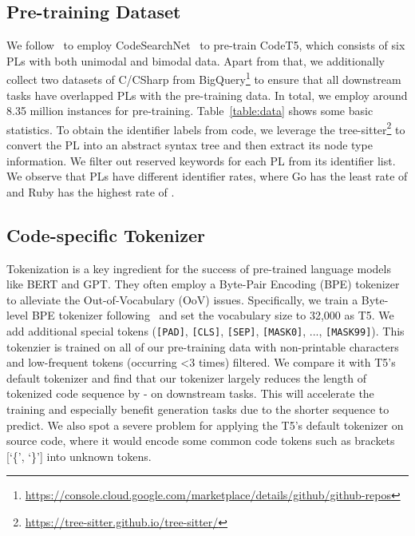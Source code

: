 \documentclass[11pt]{article}
\begin{document}
 
\subsection{Pre-training Dataset}
We follow~\citet{DBLP:conf/emnlp/FengGTDFGS0LJZ20} to employ CodeSearchNet~\cite{DBLP:journals/corr/abs-1909-09436} to pre-train CodeT5, which consists of six PLs with both unimodal and bimodal data.  Apart from that, we additionally collect two datasets of C/CSharp from BigQuery\footnote{\url{https://console.cloud.google.com/marketplace/details/github/github-repos}} to ensure that all downstream tasks have overlapped PLs with the pre-training data. In total, we employ around 8.35 million instances for pre-training. Table~\ref{table:data} shows some basic statistics.
To obtain the identifier labels from code, we leverage the tree-sitter\footnote{\url{https://tree-sitter.github.io/tree-sitter/}} to convert the PL into an abstract syntax tree  and then extract its node type information. 
We filter out reserved keywords for each PL from its identifier list. 
We observe that PLs have different identifier rates, where  Go has the least rate of  and  Ruby has the highest rate of .

\subsection{Code-specific Tokenizer}
Tokenization is a key ingredient for the success of pre-trained language models like BERT and GPT. They often employ a Byte-Pair Encoding (BPE) tokenizer~\cite{DBLP:conf/acl/SennrichHB16a} to alleviate the Out-of-Vocabulary (OoV) issues.
Specifically, we train a Byte-level BPE tokenizer following~\citet{radford2019language} and  set the vocabulary size to 32,000 as T5. We add additional special tokens (\texttt{[PAD]}, \texttt{[CLS]}, \texttt{[SEP]}, \texttt{[MASK0]}, ..., \texttt{[MASK99]}). 
This tokenzier is trained on all of our pre-training data with non-printable characters and low-frequent tokens (occurring <3 times) filtered. We compare it with T5's default tokenizer and find that our tokenizer largely reduces the length of tokenized code sequence by   -  on downstream tasks. 
This will   accelerate the training and especially  benefit generation tasks due to the shorter sequence to predict.
We also spot a severe problem for applying the T5's default tokenizer on source code, where it would encode some common code tokens such as brackets [`\{', `\}'] into unknown tokens.  
\end{document}
